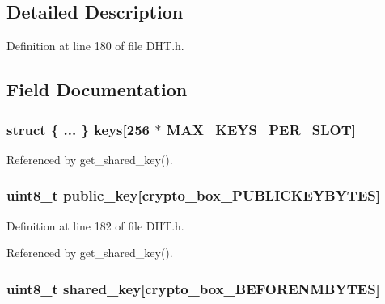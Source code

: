 \subsection{Detailed Description}


Definition at line 180 of file D\+H\+T.\+h.



\subsection{Field Documentation}
\hypertarget{struct_shared___keys_a15077d043938aa92f7ee5278d0036f7f}{
\subsubsection[{keys}]{\setlength{\rightskip}{0pt plus 5cm}struct \{ ... \}   keys\mbox{[}256 $\ast$ {\bf M\+A\+X\+\_\+\+K\+E\+Y\+S\+\_\+\+P\+E\+R\+\_\+\+S\+L\+O\+T}\mbox{]}}}\label{struct_shared___keys_a15077d043938aa92f7ee5278d0036f7f}


Referenced by get\+\_\+shared\+\_\+key().

\hypertarget{struct_shared___keys_aaa806bb1136fb3d4b5d8d8970b596ff7}{
\subsubsection[{public\+\_\+key}]{\setlength{\rightskip}{0pt plus 5cm}uint8\+\_\+t public\+\_\+key\mbox{[}crypto\+\_\+box\+\_\+\+P\+U\+B\+L\+I\+C\+K\+E\+Y\+B\+Y\+T\+E\+S\mbox{]}}}\label{struct_shared___keys_aaa806bb1136fb3d4b5d8d8970b596ff7}


Definition at line 182 of file D\+H\+T.\+h.



Referenced by get\+\_\+shared\+\_\+key().

\hypertarget{struct_shared___keys_a81ead9fac55a0cedc30a96253a2c5119}{
\subsubsection[{shared\+\_\+key}]{\setlength{\rightskip}{0pt plus 5cm}uint8\+\_\+t shared\+\_\+key\mbox{[}crypto\+\_\+box\+\_\+\+B\+E\+F\+O\+R\+E\+N\+M\+B\+Y\+T\+E\+S\mbox{]}}}\label{struct_shared___keys_a81ead9fac55a0cedc30a96253a2c5119}


